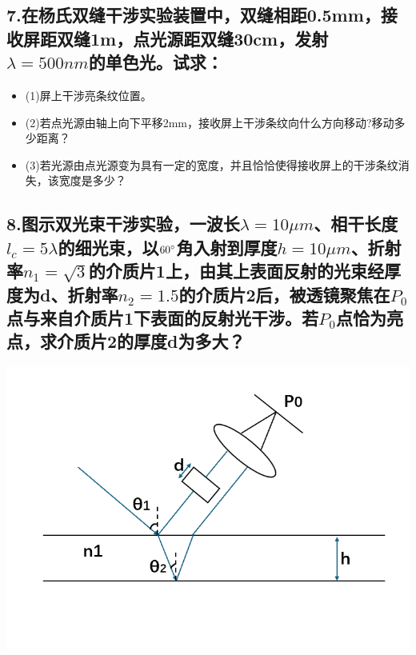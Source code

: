 \documentclass[11pt,a4paper]{article}
\begin{document}
    \subsection*{7.在杨氏双缝干涉实验装置中，双缝相距0.5mm，接收屏距双缝1m，点光源距双缝30cm，发射$\lambda =500nm$的单色光。试求：}
    \begin{itemize}
        \vspace{0mm}
        \item (1)屏上干涉亮条纹位置。
        \vspace{0mm}
        \item (2)若点光源由轴上向下平移2mm，接收屏上干涉条纹向什么方向移动?移动多少距离？
        \vspace{0mm}
        \item (3)若光源由点光源变为具有一定的宽度，并且恰恰使得接收屏上的干涉条纹消失，该宽度是多少？
        
    \end{itemize}
    \vspace{20mm}
    \subsection*{8.图示双光束干涉实验，一波长$\lambda =10\mu m$、相干长度$l_c=5\lambda$的细光束，以$60\degree$角入射到厚度$h=10\mu m$、折射率$n_1=\sqrt{3}$的介质片1上，由其上表面反射的光束经厚度为d、折射率$n_2=1.5$的介质片2后，被透镜聚焦在$P_0$点与来自介质片1下表面的反射光干涉。若$P_0$点恰为亮点，求介质片2的厚度d为多大？}

    \includegraphics[scale=0.2]{3.png}%
    \vspace{20mm}
\end{document}

